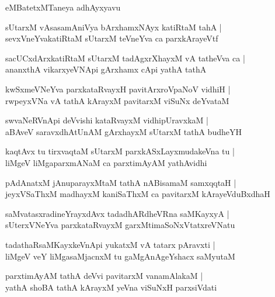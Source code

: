 \documentclass[twoside,12pt,openright]{book}
\newcounter{shloka}[chapter]
\begin{document}
\begin{center}
eMBatetxMTaneya adhAyxyavu
\end{center}

\begin{shloka}%
sUtarxM vAsasamAniVya bArxhamxNAyx katiRtaM tahA |\\
sevxVneYvakatiRtaM sUtarxM teVneYva ca parxkArayeVtf
\end{shloka}

\begin{shloka}%
sacUCxdArxkatiRtaM sUtarxM tadAgxrXhayxM vA tatheVva ca |\\
ananxthA vikarxyeVNApi gArxhamx cApi yathA tathA 
\end{shloka}

\begin{shloka}%
kwSxmeVNeYva parxkataRvayxH pavitArxroVpaNoV vidhiH |\\
rwpeyxVNa vA tathA kArayxM pavitarxM viSuNx deYvataM 
\end{shloka}

\begin{shloka}%
swvaNeRVnApi deVvishi kataRvayxM vidhipUravxkaM |\\
aBAveV saravxdhAtUnAM gArxhayxM sUtarxM tathA budheYH 
\end{shloka}

\begin{shloka}%
kaqtAvx tu tirxvaqtaM sUtarxM parxkASxLayxmudakeVna tu |\\
liMgeV liMgaparxmANaM ca parxtimAyAM yathAvidhi
\end{shloka}

\begin{shloka}%
pAdAnatxM jAnuparayxMtaM tathA nABisamaM samxqqtaH |\\
jeyxVSaThxM madhayxM kaniSaThxM ca pavitarxM kArayeVduBxdhaH 
\end{shloka}

\begin{shloka}%
saMvatasxradineYrayxdAvx tadadhARdheVRna saMKayxyA |\\
sUterxVNeYva parxkataRvayxM garxMtimaSoNxVtatxreVNatu 
\end{shloka}

\begin{shloka}%
tadathaRsaMKayxkeVnApi yukatxM vA tatarx pAravxti |\\
liMgeV veY liMgasaMjacnxM tu gaMgAnAgeYshacx saMyutaM 
\end{shloka}

\begin{shloka}%
parxtimAyAM tathA deVvi pavitarxM vanamAlakaM |\\
yathA shoBA tathA kArayxM yeVna viSuNxH parxsiVdati 
\end{shloka}
\end{document}
